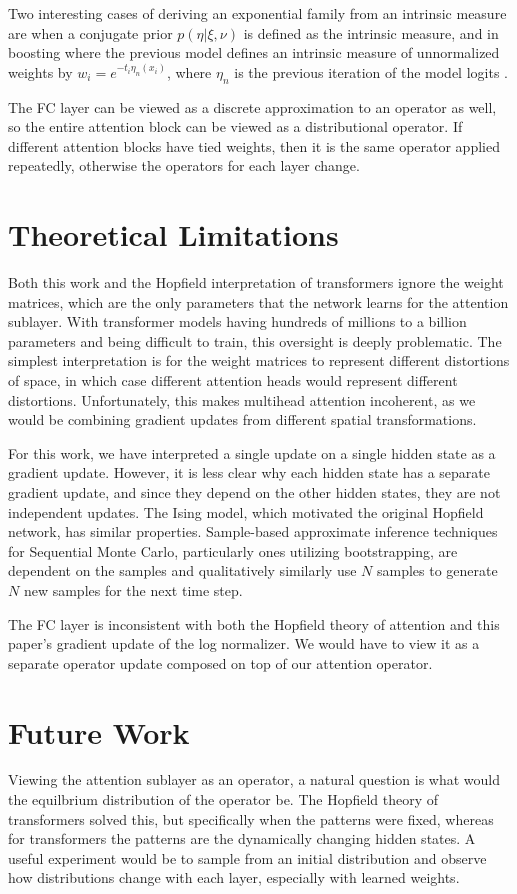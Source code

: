 \documentclass{article}
\begin{document}
Two interesting cases of deriving an exponential family from an intrinsic measure are when a conjugate prior $ p( \eta \vert \xi, \nu )$ is defined as the intrinsic measure, and in boosting where the previous model defines an intrinsic measure of unnormalized weights by $w_i = e^{ - t_i \eta_n(x_i) } $, where $\eta_n$ is the previous iteration of the model logits \cite{collins00logistic}.

The FC layer can be viewed as a discrete approximation to an operator as well, so the entire attention block can be viewed as a distributional operator.  If different attention blocks have tied weights, then it is the same operator applied repeatedly, otherwise the operators for each layer change.

\section{Theoretical Limitations}
\label{limitations}
Both this work and the Hopfield interpretation of transformers ignore the weight matrices, which are the only parameters that the network learns for the attention sublayer. 
With transformer models having hundreds of millions to a billion parameters and being difficult to train, this oversight is deeply problematic. 
The simplest interpretation is for the weight matrices to represent different distortions of space, in which case different attention heads would represent different distortions.
Unfortunately, this makes multihead attention incoherent, as we would be combining gradient updates from different spatial transformations.

For this work, we have interpreted a single update on a single hidden state as a gradient update. 
However, it is less clear why each hidden state has a separate gradient update, and since they depend on the other hidden states, they are not independent updates. The Ising model, which motivated the original Hopfield network, has similar properties. Sample-based approximate inference techniques for Sequential Monte Carlo, particularly ones utilizing bootstrapping, are dependent on the samples and qualitatively similarly use $N$ samples to generate $N$ new samples for the next time step.

The FC layer is inconsistent with both the Hopfield theory of attention and this paper's gradient update of the log normalizer. We would have to view it as a separate operator update composed on top of our attention operator.

\section{Future Work}
\label{future work}
Viewing the attention sublayer as an operator, a natural question is what would the equilbrium distribution of the operator be. 
The Hopfield theory of transformers solved this, but specifically when the patterns were fixed, whereas for transformers the patterns are the dynamically changing hidden states.
A useful experiment would be to sample from an initial distribution and observe how distributions change with each layer, especially with learned weights.
\end{document}
